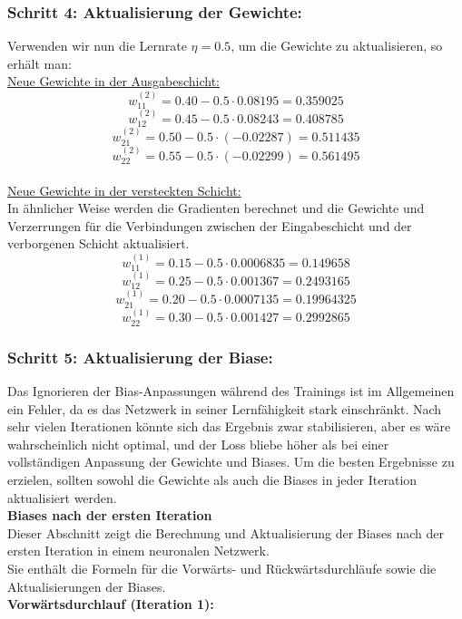 \documentclass[12pt]{article}
\begin{document}
\subsubsection{Schritt 4: Aktualisierung der Gewichte:}

Verwenden wir nun die Lernrate \(\eta = 0.5\), um die Gewichte zu aktualisieren, so erhält man:\\

\underline{Neue Gewichte in der Ausgabeschicht:}
\[
w^{(2)}_{11} = 0.40 - 0.5 \cdot 0.08195 = 0.359025
\]
\[
w^{(2)}_{12} = 0.45 - 0.5 \cdot 0.08243 = 0.408785
\]
\[
w^{(2)}_{21} = 0.50 - 0.5 \cdot (-0.02287) = 0.511435
\]
\[
w^{(2)}_{22} = 0.55 - 0.5 \cdot (-0.02299) = 0.561495
\] \\

\underline{Neue Gewichte in der versteckten Schicht:}\\[0.3cm]
%
In ähnlicher Weise werden die Gradienten berechnet und die Gewichte und Verzerrungen für die Verbindungen zwischen der Eingabeschicht und der verborgenen Schicht aktualisiert.\\
\[
w^{(1)}_{11} = 0.15 - 0.5 \cdot 0.0006835 = 0.149658
\]
\[
w^{(1)}_{12} = 0.25 - 0.5 \cdot 0.001367 = 0.2493165
\]
\[
w^{(1)}_{21} = 0.20 - 0.5 \cdot 0.0007135 = 0.19964325
\]
\[
w^{(1)}_{22} = 0.30 - 0.5 \cdot 0.001427 = 0.2992865
\] 
%
\subsubsection{Schritt 5: Aktualisierung der Biase:}
Das Ignorieren der Bias-Anpassungen während des Trainings ist im Allgemeinen ein Fehler, da es das Netzwerk in seiner Lernfähigkeit stark einschränkt. Nach sehr vielen Iterationen könnte sich das Ergebnis zwar stabilisieren, aber es wäre wahrscheinlich nicht optimal, und der Loss bliebe höher als bei einer vollständigen Anpassung der Gewichte und Biases. Um die besten Ergebnisse zu erzielen, sollten sowohl die Gewichte als auch die Biases in jeder Iteration aktualisiert werden.\\[0.3cm]
%
\textbf{Biases nach der ersten Iteration}\\
%
Dieser Abschnitt zeigt die Berechnung und Aktualisierung der Biases nach der ersten Iteration in einem neuronalen Netzwerk.\\
Sie enthält die Formeln für die Vorwärts- und Rückwärtsdurchläufe sowie die Aktualisierungen der Biases.\\[0.3cm]
%
\textbf{Vorwärtsdurchlauf (Iteration 1):}\\
\end{document}
